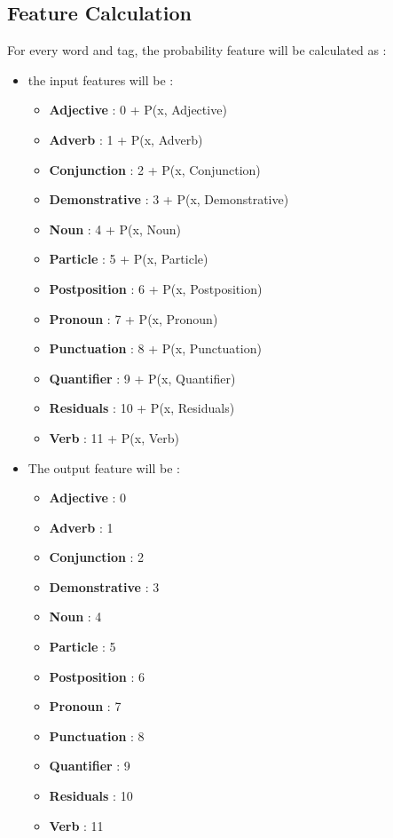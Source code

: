 \documentclass{standalone}
\begin{document}
  \subsection{Feature Calculation}
   For every word and tag, the probability feature will be calculated as :
  \begin{itemize}
  \item the input features will be :
  \begin{itemize}
        \item {\bf Adjective}       : 0 + P(x, Adjective)
        \item {\bf Adverb}          : 1 + P(x, Adverb)
        \item {\bf Conjunction}     : 2 + P(x, Conjunction)
        \item {\bf Demonstrative}   : 3 + P(x, Demonstrative)
        \item {\bf Noun}            : 4 + P(x, Noun)
        \item {\bf Particle}        : 5 + P(x, Particle)
        \item {\bf Postposition}    : 6 + P(x, Postposition)
        \item {\bf Pronoun}         : 7 + P(x, Pronoun)
        \item {\bf Punctuation}     : 8 + P(x, Punctuation)
        \item {\bf Quantifier}      : 9 + P(x, Quantifier)
        \item {\bf Residuals}       : 10 + P(x, Residuals)
        \item {\bf Verb}            : 11 + P(x, Verb)
  \end{itemize}
 
\item The output feature will be :
\begin{itemize}
        \item {\bf Adjective}       : 0 
        \item {\bf Adverb}          : 1 
        \item {\bf Conjunction}     : 2 
        \item {\bf Demonstrative}   : 3 
        \item {\bf Noun}            : 4 
        \item {\bf Particle}        : 5 
        \item {\bf Postposition}    : 6 
        \item {\bf Pronoun}         : 7 
        \item {\bf Punctuation}     : 8 
        \item {\bf Quantifier}      : 9 
        \item {\bf Residuals}       : 10 
        \item {\bf Verb}            : 11 
  \end{itemize}
\end{itemize}
\end{document}
